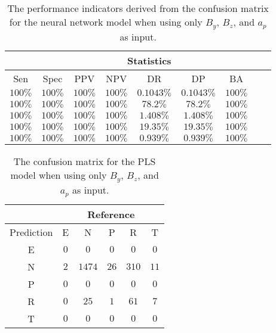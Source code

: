 \begin{table}[!ht]
	\centering
	\begin{tabular}{|c|c|c|c|c|c|c|c|c|}
		\hline
		 & \multicolumn{7}{c|}{Statistics} \\ \hline
		Sen & Spec & PPV & NPV & DR & DP & BA \\ \hline
		$100\%$ & $100\%$ & $100\%$ & $100\%$ & $0.1043\%$ & $0.1043\%$ & $100\%$ \\ \hline
		$100\%$ & $100\%$ & $100\%$ & $100\%$ & $78.2\%$ & $78.2\%$ & $100\%$ \\ \hline
		$100\%$ & $100\%$ & $100\%$ & $100\%$ & $1.408\%$ & $1.408\%$ & $100\%$ \\ \hline
		$100\%$ & $100\%$ & $100\%$ & $100\%$ & $19.35\%$ & $19.35\%$ & $100\%$ \\ \hline
		$100\%$ & $100\%$ & $100\%$ & $100\%$ & $0.939\%$ & $0.939\%$ & $100\%$ \\ \hline
	\end{tabular}
	\caption{The performance indicators derived from the confusion matrix for the neural network model when using only $B_{y}$, $B_{z}$, and $a_{p}$ as input.}
	\label{tab:cs:yzap:nnet}
\end{table}

\begin{table}[!ht]
	\centering
	\begin{tabular}{|c|c|c|c|c|c|}
		\hline
		 & \multicolumn{5}{|c|}{Reference} \\ \hline
		 Prediction & E & N & P & R & T \\ \hline
		 E & $0$ & $0$ & $0$ & $0$ & $0$ \\ \hline
		 N & $2$ & $1474$ & $26$ & $310$ & $11$ \\ \hline
		 P & $0$ & $0$ & $0$ & $0$ & $0$ \\ \hline
		 R & $0$ & $25$ & $1$ & $61$ & $7$ \\ \hline
		 T & $0$ & $0$ & $0$ & $0$ & $0$ \\ \hline
	\end{tabular}
	\caption{The confusion matrix for the PLS model when using only $B_{y}$, $B_{z}$, and $a_{p}$ as input.}
	\label{tab:cm:yzap:pls}
\end{table}

